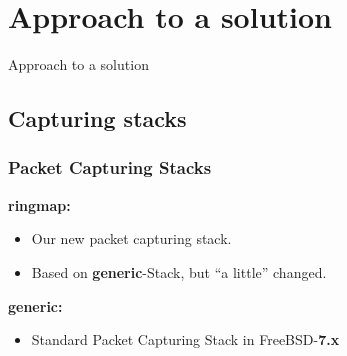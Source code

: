 \documentclass{beamer}
\begin{document}
\begin{frame}
\begin{columns}
\begin{figure}
\end{figure}
\end{columns}
\end{frame}



\section{Approach to a solution}

\begin{frame}
	\begin{center}
	\huge{Approach to a solution}
	\end{center}
\end{frame}


\subsection*{Capturing stacks}
\begin{frame}
\frametitle{Packet Capturing Stacks}
\textbf{ringmap:}
\begin{itemize}
	\item Our new packet capturing stack.
	\item Based on \textbf{generic}-Stack, but "`a little"' changed.\newline
\end{itemize}
\textbf{generic:}
\begin{itemize}
	\item Standard Packet Capturing Stack in FreeBSD-\textbf{7.x}\newline
\end{itemize}
\end{frame}
\end{document}
